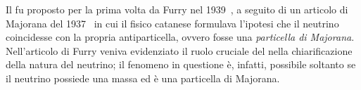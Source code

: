 

Il \doppiobeta{} fu proposto per la prima volta da Furry nel 1939~\cite{furry:pr39}, a seguito di un articolo di Majorana del 1937~\cite{majorana:nc37} in cui il fisico catanese formulava l'ipotesi che il neutrino coincidesse con la propria antiparticella, ovvero fosse una \emph{particella di Majorana}. 
Nell'articolo di Furry veniva evidenziato il ruolo cruciale del \doppiobeta{} nella chiarificazione della natura del neutrino; il fenomeno in questione è, infatti, possibile soltanto se il neutrino possiede una massa ed è una particella di Majorana. 



